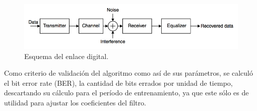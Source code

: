 \documentclass[main.tex]{subfiles}
\begin{document}
\begin{figure}[H]
    \centering
    \includegraphics[scale=0.5]{imagenes/preblock.png}
    \caption{Esquema del enlace digital.}
\end{figure}

Como criterio de validación del algoritmo como así de sus parámetros, se calculó el bit error rate (BER), la
cantidad de bits errados por unidad de tiempo, descartando su cálculo para el 
período  de entrenamiento, ya que este sólo es de utilidad para ajustar los coeficientes del filtro.
\end{document}
